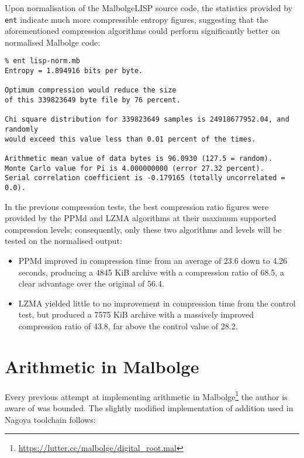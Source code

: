 \par Upon normalisation of the MalbolgeLISP source code, the statistics provided by \verb|ent| indicate much more compressible entropy figures, suggesting that the aforementioned compression algorithms could perform significantly better on normalised Malbolge code:

\begin{verbatim}
% ent lisp-norm.mb
Entropy = 1.894916 bits per byte.

Optimum compression would reduce the size
of this 339823649 byte file by 76 percent.

Chi square distribution for 339823649 samples is 24918677952.04, and randomly
would exceed this value less than 0.01 percent of the times.

Arithmetic mean value of data bytes is 96.0930 (127.5 = random).
Monte Carlo value for Pi is 4.000000000 (error 27.32 percent).
Serial correlation coefficient is -0.179165 (totally uncorrelated = 0.0).
\end{verbatim}

\par In the previous compression tests, the best compression ratio figures were provided by the PPMd and LZMA algorithms at their maximum supported compression levels; consequently, only these two algorithms and levels will be tested on the normalised output:
\begin{itemize}
    \item PPMd improved in compression time from an average of 23.6 down to 4.26 seconds, producing a 4845 KiB archive with a compression ratio of 68.5, a clear advantage over the original of 56.4.
    \item LZMA yielded little to no improvement in compression time from the control test, but produced a 7575 KiB archive with a massively improved compression ratio of 43.8, far above the control value of 28.2.
\end{itemize}

\section{Arithmetic in Malbolge}

\par Every previous attempt at implementing arithmetic in Malbolge\footnote{\url{https://lutter.cc/malbolge/digital_root.mal}} the author is aware of was bounded. The slightly modified implementation of addition used in Nagoya toolchain follows:

